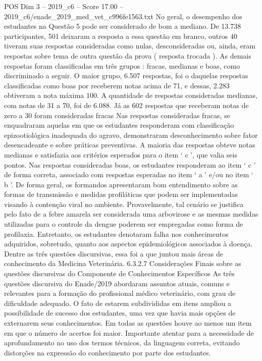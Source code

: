 \begin{textsample}{POS Dim 3 – 2019\_c6 – Score 17.00 – 2019\_c6/enade\_2019\_med\_vet\_c996fe1563.txt}
No geral, o desempenho dos estudantes na Questão 5 pode ser considerado de bom a mediano.
De 13.738 participantes, 501 deixaram a resposta a essa questão em branco, outros 40 tiveram suas respostas consideradas como nulas, desconsideradas ou, ainda, eram respostas sobre tema de outra questão da prova ( resposta trocada ).
As demais respostas foram classificadas em três grupos : fracas, medianas e boas, como discriminado a seguir.
O maior grupo, 6.507 respostas, foi o daquelas respostas classificadas como boas por receberem notas acima de 71, e dessas, 2.283 obtiveram a nota máxima 100.
A quantidade de respostas consideradas medianas, com notas de 31 a 70, foi de 6.088.
Já as 602 respostas que receberam notas de zero a 30 foram consideradas fracas Nas respostas consideradas fracas, se enquadraram aquelas em que os estudantes responderam com classificação epizootiológica inadequada do agravo, demonstraram desconhecimento sobre fator desencadeante e sobre práticas preventivas.
A maioria das respostas obteve notas medianas e satisfazia aos critérios esperados para o item ‘ c ’, que valia seis pontos.
Nas respostas consideradas boas, os estudantes responderam ao item ‘ c ’ de forma correta, associado com respostas esperadas no item ‘ a ’ e/ou no item ‘ b ’.
De forma geral, os formandos apresentaram bom entendimento sobre as formas de transmissão e medidas profiláticas que podem ser implementadas visando à contenção viral no ambiente.
Provavelmente, tal cenário se justifica pelo fato de a febre amarela ser considerada uma arbovirose e as mesmas medidas utilizadas para o controle da dengue poderem ser empregadas como forma de profilaxia.
Entretanto, os estudantes denotaram falha nos conhecimentos adquiridos, sobretudo, quanto aos aspectos epidemiológicos associados à doença.
Dentre as três questões discursivas, essa foi a que juntou mais áreas de conhecimento da Medicina Veterinária. 6.3.2.7 Considerações Finais sobre as questões discursivas do Componente de Conhecimentos Específicos As três questões discursiva do Enade/2019 abordaram assuntos atuais, comuns e relevantes para a formação do profissional médico veterinário, com grau de dificuldade adequado.
O fato de estarem subdivididas em itens ampliou a possibilidade de sucesso dos estudantes, uma vez que havia mais opções de externarem seus conhecimentos.
Em todas as questões houve ao menos um item em que o número de acertos foi maior.
Importante atentar para a necessidade de aprofundamento no uso dos termos técnicos, da linguagem correta, evitando distorções na expressão do conhecimento por parte dos estudantes.

\end{textsample}
